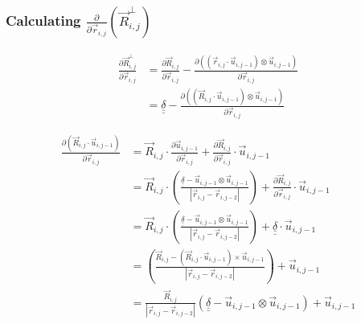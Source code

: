 \documentclass{article}
\renewcommand{\ij}{_{i,j}}
\newcommand{\ijj}{_{i,j-1}}
\newcommand{\ijjj}{_{i,j-2}}
\newcommand{\magn}[1]{\left\vert #1 \right\vert }
\renewcommand{\part}[2]{\frac{\partial #1 }{\partial #2}}
\newcommand{\partbig}[2]{\frac{\partial }{\partial #2}\left( #1 \right)}
\newcommand{\ten}[1]{\underline{\underline{#1}}}
\newcommand{\rij}{\vec{r} \ij}
\newcommand{\Rij}{\vec{R} \ij}
\newcommand{\rijjj}{\vec{r} \ijjj}
\newcommand{\uijj}{\vec{u} \ijj}
\begin{document}
 \subsubsection{Calculating $\displaystyle\partbig{\Rij^\perp}{\rij}$}

\begin{align*}
  \label{eqn:Rperpri}
  \part{\vec{R}\ij ^ \bot}{\vec{r}\ij}  
  &=
  \part{\Rij}{\rij}
  - \part{\left(\left(\vec{r}\ij \cdot \vec{u} \ijj \right) \otimes 
  \vec{u} \ijj \right)
  }{\vec{r}\ij}
  \\
  &=
  \ten{\delta} 
  - \part{\left(\left(\vec{R}\ij \cdot \vec{u} \ijj \right) \otimes 
  \vec{u} \ijj \right)
  }{\vec{r}\ij}
\end{align*}

\begin{align*}
  \part{\left(\vec{R}\ij \cdot \vec{u} \ijj \right)}{\vec{r}\ij}   
  &= 
  \vec{R}\ij \cdot \part{\vec{u} \ijj}{\vec{r} \ij} + \part{\vec{R} \ij}{\vec{r} \ij} \cdot \vec{u}\ijj
  \\
  &= 
  \vec{R}\ij \cdot 
  \left(
  {
  \frac{\ten{\delta} - \uijj \otimes \uijj}{\magn{\rij - \rijjj}}
  }
  \right)
  +
  \part{\vec{R} \ij}{\vec{r} \ij} \cdot \vec{u}\ijj
  \\
  &= 
  \vec{R}\ij \cdot 
  \left(
  {
  \frac{\ten{\delta} - \uijj \otimes \uijj}{\magn{\rij - \rijjj}}
  }
  \right)
  + \ten{\delta} \cdot \vec{u} \ijj 
  \\
  &= 
  \left(
  {
  \frac{\Rij - (\Rij \cdot \uijj ) \times \uijj}{\magn{\rij - \rijjj}}
  }
  \right)
  + 
  \vec{u} \ijj 
  \\ 
  &=
  \frac{\Rij}{\magn{\rij - \rijjj}}
  \left(
   \ten{\delta} - \uijj \otimes \uijj 
  \right)
  + \uijj
\end{align*}
\end{document}
